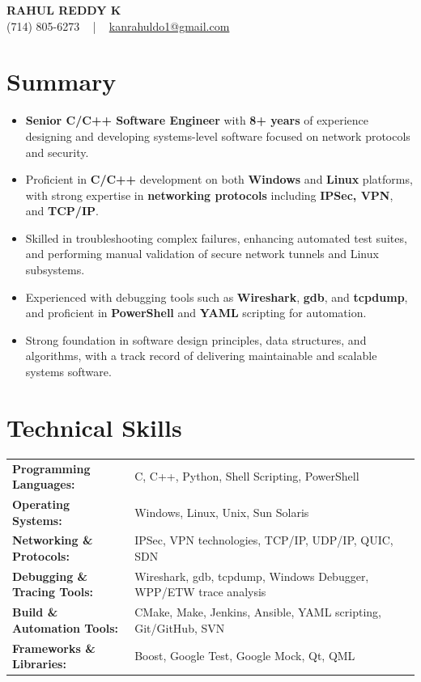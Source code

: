 \documentclass[letterpaper,11pt]{article}
\newcommand{\resumeItem}[1]{
  \item\footnotesize{
    {#1 \vspace{-2pt}}
  }
}
\newcommand{\resumeItemListStart}{\begin{itemize}[leftmargin=*]}
\newcommand{\resumeItemListEnd}{\end{itemize}\vspace{-5pt}}
\begin{document}
\begin{center}
    {\fontsize{14pt}{12pt}\selectfont \textbf{\MakeUppercase{Rahul Reddy K}}}\\ \vspace{2pt}
    \fontsize{10pt}{12pt}\selectfont (714) 805-6273 ~ | ~ \href{mailto:kanrahuldo1@gmail.com}{kanrahuldo1@gmail.com}~
    \vspace{-8pt}
\end{center}

\section{Summary}
\fontsize{9pt}{10pt}\selectfont
\resumeItemListStart
    \resumeItem{\textbf{Senior C/C++ Software Engineer} with \textbf{8+ years} of experience designing and developing systems-level software focused on network protocols and security.}
    \resumeItem{Proficient in \textbf{C/C++} development on both \textbf{Windows} and \textbf{Linux} platforms, with strong expertise in \textbf{networking protocols} including \textbf{IPSec, VPN}, and \textbf{TCP/IP}.}
    \resumeItem{Skilled in troubleshooting complex failures, enhancing automated test suites, and performing manual validation of secure network tunnels and Linux subsystems.}
    \resumeItem{Experienced with debugging tools such as \textbf{Wireshark}, \textbf{gdb}, and \textbf{tcpdump}, and proficient in \textbf{PowerShell} and \textbf{YAML} scripting for automation.}
    \resumeItem{Strong foundation in software design principles, data structures, and algorithms, with a track record of delivering maintainable and scalable systems software.}
\resumeItemListEnd
\vspace{-6pt}

\section{Technical Skills}
        \vspace{-14pt}
        \begin{table}[h]
            \fontsize{9pt}{10pt}\selectfont
            \begin{tabular}{p{0.3\linewidth} p{0.7\linewidth}}
                \textbf{Programming Languages:} & C, C++, Python, Shell Scripting, PowerShell \\
                \textbf{Operating Systems:} & Windows, Linux, Unix, Sun Solaris \\
                \textbf{Networking \& Protocols:} & IPSec, VPN technologies, TCP/IP, UDP/IP, QUIC, SDN \\
                \textbf{Debugging \& Tracing Tools:} & Wireshark, gdb, tcpdump, Windows Debugger, WPP/ETW trace analysis \\
                \textbf{Build \& Automation Tools:} & CMake, Make, Jenkins, Ansible, YAML scripting, Git/GitHub, SVN \\
                \textbf{Frameworks \& Libraries:} & Boost, Google Test, Google Mock, Qt, QML \\
            \end{tabular}
        \end{table}
    \vspace{-15pt}
\end{document}

